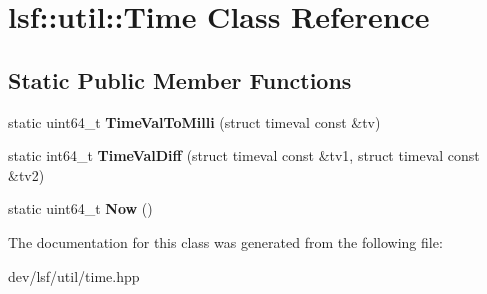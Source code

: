 \hypertarget{classlsf_1_1util_1_1Time}{
\section{lsf::util::Time Class Reference}
\label{classlsf_1_1util_1_1Time}
}
\subsection*{Static Public Member Functions}
\begin{DoxyCompactItemize}
\item 
\hypertarget{classlsf_1_1util_1_1Time_a3ca6501d91743cfa2c44e45f3fc1b1e3}{
static uint64\_\-t {\bfseries TimeValToMilli} (struct timeval const \&tv)}
\label{classlsf_1_1util_1_1Time_a3ca6501d91743cfa2c44e45f3fc1b1e3}

\item 
\hypertarget{classlsf_1_1util_1_1Time_a41d1a276c99d13c95f77c8106bb2ad8a}{
static int64\_\-t {\bfseries TimeValDiff} (struct timeval const \&tv1, struct timeval const \&tv2)}
\label{classlsf_1_1util_1_1Time_a41d1a276c99d13c95f77c8106bb2ad8a}

\item 
\hypertarget{classlsf_1_1util_1_1Time_acad7899d0554c034a7eede334b037d49}{
static uint64\_\-t {\bfseries Now} ()}
\label{classlsf_1_1util_1_1Time_acad7899d0554c034a7eede334b037d49}

\end{DoxyCompactItemize}


The documentation for this class was generated from the following file:\begin{DoxyCompactItemize}
\item 
dev/lsf/util/time.hpp\end{DoxyCompactItemize}

